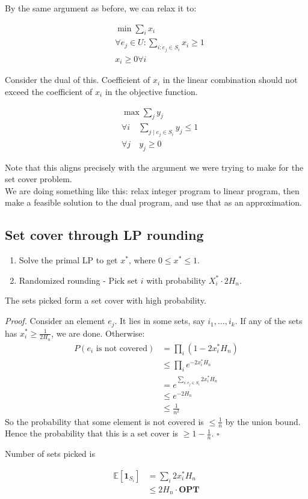 \documentclass[a4paper]{article}
\newenvironment{proof}{\begin{breakbox}\textit{Proof.}}{\hfill$\square$\end{breakbox}}
\newcommand{\nl}{\vspace{0.2cm}\\}
\newcommand{\OPT}{\mathbf{OPT}}
\begin{document}
By the same argument as before, we can relax it to:

\begin{align*}
    &\min \sum_{i} x_i\\
    &\forall e_j \in U: \sum_{i : e_j \in S_i} x_i \ge 1\\
    &x_i \ge 0 \forall i
\end{align*}

Consider the dual of this. Coefficient of $x_i$ in the linear combination should not exceed the coefficient of $x_i$ in the objective function.

\begin{align*}
    &\max \sum_j y_j\\
    &\forall i \quad \sum_{j \mid e_j \in S_i} y_j \le 1\\
    &\forall j \quad y_j \ge 0
\end{align*}

Note that this aligns precisely with the argument we were trying to make for the set cover problem.\nl

We are doing something like this: relax integer program to linear program, then make a feasible solution to the dual program, and use that as an approximation.\nl

\subsection{Set cover through LP rounding}

\begin{enumerate}
    \item Solve the primal LP to get $x^*$, where $0 \le x^* \le 1$.
    \item Randomized rounding - Pick set $i$ with probability $X_i^* \cdot 2 H_n$.
\end{enumerate}

\begin{claim}
    The sets picked form a set cover with high probability.
\end{claim}
\begin{proof}
    Consider an element $e_j$. It lies in some sets, say $i_1, \ldots, i_k$. If any of the sets has $x_i^* \ge \frac{1}{2 H_n}$, we are done. Otherwise:\nl
    \begin{align*}
        P(e_i \text{ is not covered}) &= \prod_i (1 - 2 x_i^* H_n)\\
                              &\le \prod_i e^{-2 x_i^* H_n}\\
                              &= e^{\sum_{i : e_j \in S_i} 2 x_i^* H_n}\\
                              &\le e^{-2H_n}\\
                              &\le \frac{1}{n^2}
    \end{align*}
    So the probability that some element is not covered is $\le \frac{1}{n}$ by the union bound. Hence the probability that this is a set cover is $\ge 1 - \frac{1}{n}$.
\end{proof}

Number of sets picked is

\begin{align*}
    \mathbb{E}\left[\textbf{1}_{S_i}\right] &= \sum_i 2 x_i^* H_n\\
                       &\le 2 H_n \cdot \OPT
\end{align*}
\end{document}
